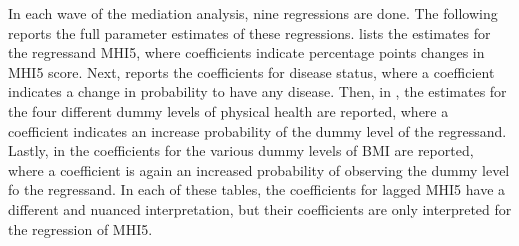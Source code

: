 In each wave of the mediation analysis, nine regressions are done. The following reports the full parameter estimates
of these regressions.
 lists the estimates for the regressand MHI5, where coefficients indicate percentage
points changes in MHI5 score.
Next,  reports the coefficients for disease status, where a coefficient
indicates a change in probability to have any disease.
Then, in ,
the estimates for the four different dummy levels of physical health are reported,
where a coefficient indicates an increase probability of the dummy level of the regressand.
Lastly, in 
the coefficients for the various dummy levels of BMI are reported, where a coefficient is again an increased
probability of observing the dummy level fo the regressand.
In each of these tables, the coefficients for lagged MHI5 have a different and nuanced interpretation,
but their coefficients are only interpreted for the regression of MHI5.

